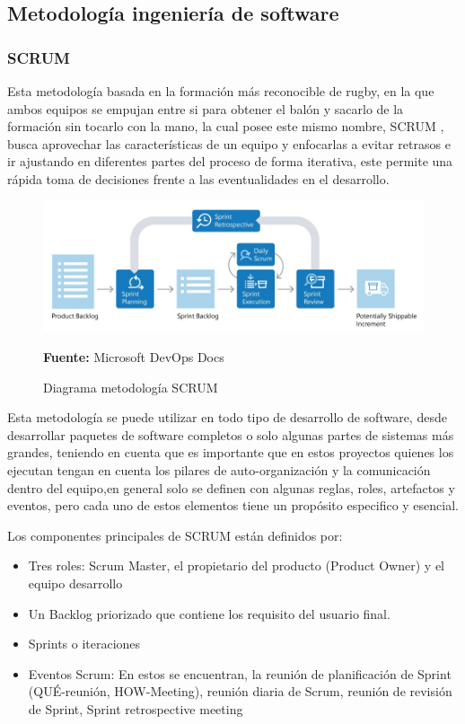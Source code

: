\subsection{Metodología ingeniería de software}
\subsubsection{SCRUM}

Esta metodología basada en la formación más reconocible de rugby, en la que ambos equipos se empujan entre si para obtener el balón y sacarlo de la formación sin tocarlo con la mano, la cual posee este mismo nombre, SCRUM \parencite{AlexanderMenzinskyGertrudisLopez2016ScrumManage}, busca aprovechar las características de un equipo y enfocarlas a evitar retrasos  e ir ajustando en diferentes partes del proceso de forma iterativa, este permite una rápida toma de decisiones frente a las eventualidades en el desarrollo.

\begin{figure}[H]
    \centering
    \includegraphics[width=1\textwidth]{Anexos/LATEX/chapters/images/scrum.jpg}
    \caption{Diagrama metodología SCRUM}
    \small{\textbf{Fuente:} Microsoft DevOps Docs}
    \label{SCRUM}
\end{figure}

Esta metodología se puede utilizar en todo tipo de desarrollo de software, desde desarrollar paquetes de software completos o solo algunas partes de sistemas más grandes, teniendo en cuenta que es importante que en estos proyectos quienes los ejecutan tengan en cuenta los pilares de auto-organización y la comunicación dentro del equipo,en general solo se definen con algunas reglas, roles, artefactos y eventos, pero cada uno de estos elementos tiene un propósito especifico y esencial.

Los componentes principales de SCRUM están definidos por:
\begin{itemize}
    \item Tres roles: Scrum Master, el propietario del producto (Product Owner) y el equipo desarrollo
    \item Un Backlog priorizado que contiene los requisito del usuario final.
    \item Sprints o iteraciones
    \item Eventos Scrum: En estos se encuentran, la reunión de planificación de Sprint (QUÉ-reunión, HOW-Meeting), reunión diaria de Scrum, reunión de revisión de Sprint, Sprint retrospective meeting 
\end{itemize}

